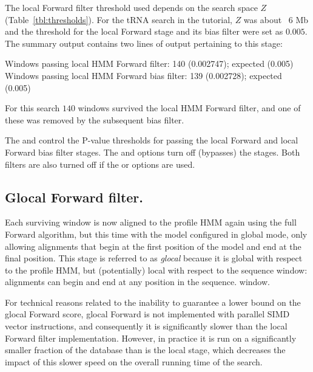 \begin{sreoutput}
The local Forward filter threshold used depends on
the search space $Z$ (Table~\ref{tbl:thresholds}). For the tRNA search
in the tutorial, $Z$ was about ~$6$ Mb and the threshold for the local
Forward stage and its bias filter were set as $0.005$. The summary
output contains two lines of output pertaining to this stage:

\begin{sreoutput}
Windows   passing  local HMM Forward       filter:             140  (0.002747); expected (0.005)
Windows   passing  local HMM Forward  bias filter:             139  (0.002728); expected (0.005)
\end{sreoutput}

For this search $140$ windows survived the local HMM Forward filter,
and one of these was removed by the subsequent bias filter. 

The  and  control the P-value thresholds for
passing the local Forward and local Forward bias filter stages.  The
 and  options turn off (bypasses) the
stages. Both filters are also turned off if the  or
 options are used.

\subsection{Glocal Forward filter.}

Each surviving window is now aligned to the profile HMM again using the full
Forward algorithm, but this time with the model configured in global
mode, only allowing alignments that begin at the first position of the
model and end at the final position. This stage is referred to as
\emph{glocal} because it is global with respect to the profile HMM,
but (potentially) local with respect to the sequence window:
alignments can begin and end at any position in the sequence. 
window. 

For technical reasons related to the inability to guarantee a lower
bound on the glocal Forward score, glocal Forward is not implemented
with parallel SIMD vector instructions, and consequently it is
significantly slower than the local Forward filter
implementation. However, in practice it is run on a significantly
smaller fraction of the database than is the local stage, which
decreases the impact of this slower speed on the overall running time
of the search. 


\end{sreoutput}
